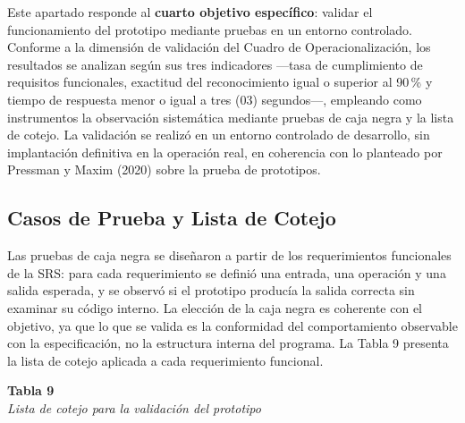 \documentclass[12pt, letterpaper]{report}
\begin{document}
Este apartado responde al \textbf{cuarto objetivo específico}: validar
el funcionamiento del prototipo mediante pruebas en un entorno
controlado. Conforme a la dimensión de validación del Cuadro de
Operacionalización, los resultados se analizan según sus tres
indicadores ---tasa de cumplimiento de requisitos funcionales,
exactitud del reconocimiento igual o superior al 90\,\% y tiempo de
respuesta menor o igual a tres (03) segundos---, empleando como
instrumentos la observación sistemática mediante pruebas de caja negra
y la lista de cotejo. La validación se realizó en un entorno controlado
de desarrollo, sin implantación definitiva en la operación real, en
coherencia con lo planteado por Pressman y Maxim (2020) sobre la prueba
de prototipos.

\subsection{Casos de Prueba y Lista de Cotejo}

Las pruebas de caja negra se diseñaron a partir de los requerimientos
funcionales de la SRS: para cada requerimiento se definió una entrada,
una operación y una salida esperada, y se observó si el prototipo
producía la salida correcta sin examinar su código interno. La elección
de la caja negra es coherente con el objetivo, ya que lo que se valida
es la conformidad del comportamiento observable con la especificación,
no la estructura interna del programa. La Tabla 9 presenta la lista de
cotejo aplicada a cada requerimiento funcional.

\vspace{6pt}
%
\noindent\textbf{Tabla 9}\\
\textit{Lista de cotejo para la validación del prototipo}
\vspace{4pt}
\end{document}
